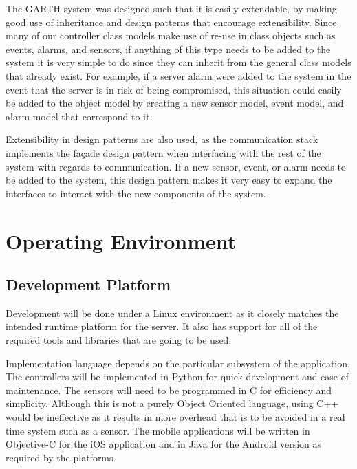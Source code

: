 \documentclass{report}
\begin{document}
The GARTH system was designed such that it is easily extendable, by making good
use of inheritance and design patterns that encourage extensibility. Since many
of our controller class models make use of re-use in class objects such as
events, alarms, and sensors, if anything of this type needs to be added to the
system it is very simple to do since they can inherit from the general class
models that already exist. For example, if a server alarm were added to the
system in the event that the server is in risk of being compromised, this
situation could easily be added to the object model by creating a new sensor
model, event model, and alarm model that correspond to it.

Extensibility in design patterns are also used, as the communication stack
implements the fa\c{c}ade design pattern when interfacing with the rest of the
system with regards to communication. If a new sensor, event, or alarm needs to
be added to the system, this design pattern makes it very easy to expand the
interfaces to interact with the new components of the system.

\chapter{Operating Environment} %
\label{ch:operating-environment}

\section{Development Platform}


Development will be done under a Linux environment as it closely matches the
intended runtime platform for the server. It also has support for all of the
required tools and libraries that are going to be used. 

Implementation language depends on the particular subsystem of the application.
The controllers will be implemented in Python for quick development and ease of 
maintenance. The sensors will need to be programmed in C for efficiency and
simplicity. Although this is not a purely Object Oriented language, using C++
would be ineffective as it results in more overhead that is to be avoided in a
real time system such as a sensor. The mobile applications will be written in
Objective-C for the iOS application and in Java for the Android version as
required by the platforms.
\end{document}
